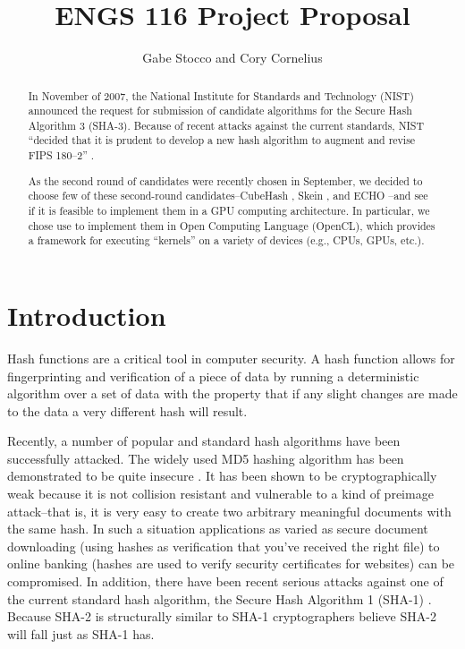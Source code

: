 \documentclass{article}
\title{ENGS 116 Project Proposal}
\author{Gabe Stocco and Cory Cornelius}
\begin{document}
\maketitle
\begin{abstract}
In November of 2007, the National Institute for Standards and Technology (NIST) announced the request for submission of candidate algorithms for the Secure Hash Algorithm 3 (SHA-3).
Because of recent attacks against the current standards, NIST ``decided that it is prudent to develop a new hash algorithm to augment and revise FIPS 180–2'' \cite{Sha3Request}.

As the second round of candidates were recently chosen in September, we decided to choose few of these second-round candidates--CubeHash \cite{CubeHash}, Skein \cite{Skein}, and ECHO \cite{ECHO}--and see if it is feasible to implement them in a GPU computing architecture.
In particular, we chose use to implement them in Open Computing Language (OpenCL), which provides a framework for executing ``kernels'' on a variety of devices (e.g., CPUs, GPUs, etc.).


\end{abstract}
 
\section*{Introduction}
Hash functions are a critical tool in computer security.
A hash function allows for fingerprinting and verification of a piece of data by running a deterministic algorithm over a set of data with the property that if any slight changes are made to the data a very different hash will result.
 
Recently, a number of popular and standard hash algorithms have been successfully attacked.
The widely used MD5 hashing algorithm has been demonstrated to be quite insecure \cite{Nostradamus}.
It has been shown to be cryptographically weak because it is not collision resistant and vulnerable to a kind of preimage attack--that is, it is very easy to create two arbitrary meaningful documents with the same hash.
In such a situation applications as varied as secure document downloading (using hashes as verification that you've received the right file) to online banking (hashes are used to verify security certificates for websites) can be compromised.
In addition, there have been recent serious attacks against one of the current standard hash algorithm, the Secure Hash Algorithm 1 (SHA-1) \cite{Sha1Collisions}.
Because SHA-2 is structurally similar to SHA-1 cryptographers believe SHA-2 will fall just as SHA-1 has.
 
\end{document}
